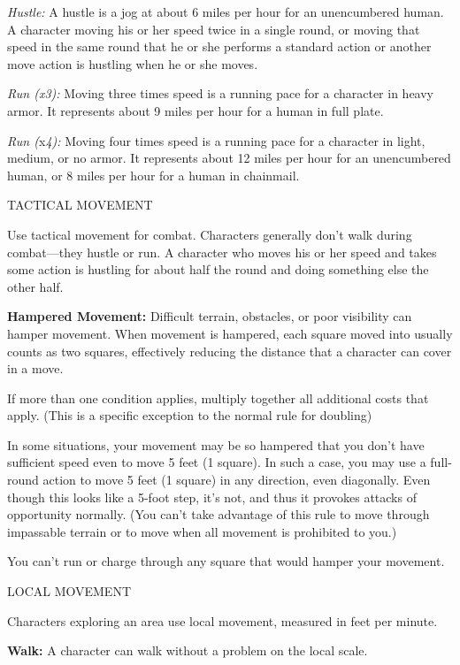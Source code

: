 \documentclass{article}
\begin{document}
\textit{Hustle: }A hustle is a jog at about 6 miles per hour for an unencumbered 
human. A character moving his or her speed twice in a single round, or moving that 
speed in the same round that he or she performs a standard action or another move 
action is hustling when he or she moves.

\textit{Run (x3): }Moving three times speed is a running pace for a character in 
heavy armor. It represents about 9 miles per hour for a human in full plate.

\textit{Run (}x\textit{4): }Moving four times speed is a running pace for a character 
in light, medium, or no armor. It represents about 12 miles per hour for an unencumbered 
human, or 8 miles per hour for a human in chainmail.

\vspace{12pt}
TACTICAL MOVEMENT

Use tactical movement for combat. Characters generally don't walk during combat---they 
hustle or run. A character who moves his or her speed and takes some action is 
hustling for about half the round and doing something else the other half.

\vspace{12pt}
\textbf{Hampered Movement:} Difficult terrain, obstacles, or poor visibility can 
hamper movement. When movement is hampered, each square moved into usually counts 
as two squares, effectively reducing the distance that a character can cover in 
a move. 

If more than one condition applies, multiply together all additional costs that 
apply. (This is a specific exception to the normal rule for doubling) 

In some situations, your movement may be so hampered that you don't have sufficient 
speed even to move 5 feet (1 square). In such a case, you may use a full-round 
action to move 5 feet (1 square) in any direction, even diagonally. Even though 
this looks like a 5-foot step, it's not, and thus it provokes attacks of opportunity 
normally. (You can't take advantage of this rule to move through impassable terrain 
or to move when all movement is prohibited to you.)

You can't run or charge through any square that would hamper your movement.

\vspace{12pt}
LOCAL MOVEMENT

Characters exploring an area use local movement, measured in feet per minute.

\textbf{Walk:} A character can walk without a problem on the local scale.
\end{document}
